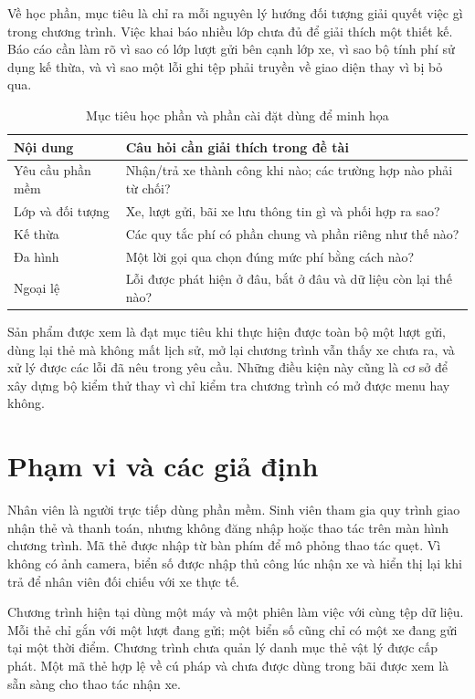 Về học phần, mục tiêu là chỉ ra mỗi nguyên lý hướng đối tượng giải quyết việc gì trong chương trình. Việc khai báo nhiều lớp chưa đủ để giải thích một thiết kế. Báo cáo cần làm rõ vì sao có lớp lượt gửi bên cạnh lớp xe, vì sao bộ tính phí sử dụng kế thừa, và vì sao một lỗi ghi tệp phải truyền về giao diện thay vì bị bỏ qua.

\begin{table}[H]
\centering\small
\caption{Mục tiêu học phần và phần cài đặt dùng để minh họa}
\label{tab:learning-goals}
\begin{tabularx}{\textwidth}{l Y}
\toprule
Nội dung & Câu hỏi cần giải thích trong đề tài\\
\midrule
Yêu cầu phần mềm & Nhận/trả xe thành công khi nào; các trường hợp nào phải từ chối?\\
Lớp và đối tượng & Xe, lượt gửi, bãi xe lưu thông tin gì và phối hợp ra sao?\\
Kế thừa & Các quy tắc phí có phần chung và phần riêng như thế nào?\\
Đa hình & Một lời gọi qua  chọn đúng mức phí bằng cách nào?\\
Ngoại lệ & Lỗi được phát hiện ở đâu, bắt ở đâu và dữ liệu còn lại thế nào?\\
\bottomrule
\end{tabularx}
\end{table}

Sản phẩm được xem là đạt mục tiêu khi thực hiện được toàn bộ một lượt gửi, dùng lại thẻ mà không mất lịch sử, mở lại chương trình vẫn thấy xe chưa ra, và xử lý được các lỗi đã nêu trong yêu cầu. Những điều kiện này cũng là cơ sở để xây dựng bộ kiểm thử thay vì chỉ kiểm tra chương trình có mở được menu hay không.

\section{Phạm vi và các giả định}
Nhân viên là người trực tiếp dùng phần mềm. Sinh viên tham gia quy trình giao nhận thẻ và thanh toán, nhưng không đăng nhập hoặc thao tác trên màn hình chương trình. Mã thẻ được nhập từ bàn phím để mô phỏng thao tác quẹt. Vì không có ảnh camera, biển số được nhập thủ công lúc nhận xe và hiển thị lại khi trả để nhân viên đối chiếu với xe thực tế.

Chương trình hiện tại dùng một máy và một phiên làm việc với cùng tệp dữ liệu. Mỗi thẻ chỉ gắn với một lượt đang gửi; một biển số cũng chỉ có một xe đang gửi tại một thời điểm. Chương trình chưa quản lý danh mục thẻ vật lý được cấp phát. Một mã thẻ hợp lệ về cú pháp và chưa được dùng trong bãi được xem là sẵn sàng cho thao tác nhận xe.

